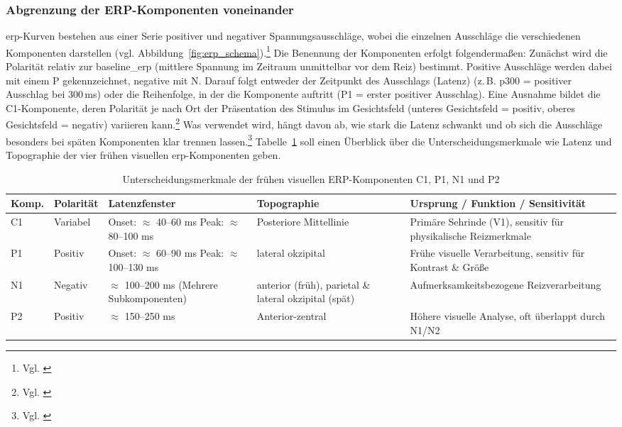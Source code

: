 \subsubsection{Abgrenzung der ERP-Komponenten voneinander}
\acrshort{erp}-Kurven bestehen aus einer Serie positiver und negativer Spannungsausschläge, wobei die einzelnen Ausschläge die verschiedenen Komponenten darstellen (vgl. Abbildung~\ref{fig:erp_schema}).\footnote{Vgl. \cite[S.~R83]{biasiucci2019}} Die Benennung der Komponenten erfolgt folgendermaßen: Zunächst wird die Polarität relativ zur \gls{baseline_erp} (mittlere Spannung im Zeitraum unmittelbar vor dem Reiz) bestimmt. Positive Ausschläge werden dabei mit einem P gekennzeichnet, negative mit N. Darauf folgt entweder der Zeitpunkt des Ausschlags (Latenz) (z.\,B. \gls{p300} = positiver Ausschlag bei 300\,ms) oder die Reihenfolge, in der die Komponente auftritt (P1 = erster positiver Ausschlag). Eine Ausnahme bildet die C1-Komponente, deren Polarität je nach Ort der Präsentation des Stimulus im Gesichtsfeld (unteres Gesichtsfeld = positiv, oberes Gesichtsfeld = negativ) variieren kann.\footnote{Vgl. \cite[S.~35]{luck2005}} Was verwendet wird, hängt davon ab, wie stark die Latenz schwankt und ob sich die Ausschläge besonders bei späten Komponenten klar trennen lassen.\footnote{Vgl. \cite[S.~35--43]{luck2005}} Tabelle~\ref{tab:erp} soll einen Überblick über die Unterscheidungsmerkmale wie Latenz und Topographie der vier frühen visuellen \acrshort{erp}-Komponenten geben.

\begin{table}[htbp]
\centering
\caption{Unterscheidungsmerkmale der frühen visuellen ERP-Komponenten C1, P1, N1 und P2}
\label{tab:erp}
\small
\begin{tabularx}{\textwidth}{@{}l l >{\raggedright}p{3.1cm} >{\raggedright}p{3.3cm} >{\raggedright\arraybackslash}X@{}}
\toprule
\textbf{Komp.} & \textbf{Polarität} & \textbf{Latenzfenster} & \textbf{Topographie} & \textbf{Ursprung / Funktion / Sensitivität} \\
\midrule
C1 & Variabel & Onset: $\approx$ 40--60 ms \newline Peak: $\approx$ 80--100 ms & Posteriore Mittellinie & Primäre Sehrinde (V1), sensitiv für physikalische Reizmerkmale \\
\addlinespace
P1 & Positiv  & Onset: $\approx$ 60--90 ms \newline Peak: $\approx$ 100--130 ms & \Gls{lateral} okzipital & Frühe visuelle Verarbeitung, sensitiv für Kontrast \& Größe \\
\addlinespace
N1 & Negativ  & $\approx$ 100--200 ms \newline (Mehrere Subkomponenten) & \Gls{anterior} (früh), parietal \newline \& lateral okzipital (spät) & Aufmerksamkeitsbezogene Reizverarbeitung \\
\addlinespace
P2 & Positiv  & $\approx$ 150--250 ms & Anterior-zentral & Höhere visuelle Analyse, oft überlappt durch N1/N2 \\
\bottomrule
\end{tabularx}
\end{table}

